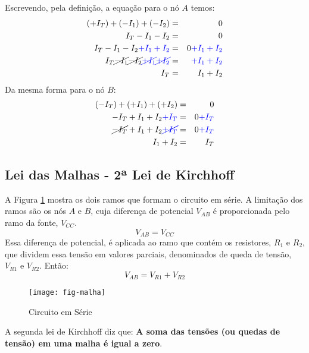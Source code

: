 Escrevendo, pela definição, a equação para o nó $A$ temos:
\begin{eqnarray}
\label{eq:1kirchhoff}
(+I_T) + (-I_1) + (-I_2) & = & 0\\
I_T - I_1 - I_2 & = & 0 \nonumber\\
I_T - I_1 - I_2 \color{blue}{+ I_1 + I_2}& = & 0 \color{blue}{+I_1 + I_2} \nonumber\\
I_T \cancel{-I_1} \cancel{- I_2} \color{blue}{\cancel{+ I_1} \cancel{+ I_2}}& = & \color{blue}{+I_1 + I_2} \nonumber\\
I_T & = & I_1 + I_2
\end{eqnarray}
Da mesma forma para o nó $B$:
\begin{eqnarray}
(-I_T) + (+I_1) + (+I_2) & = & 0 \nonumber\\
-I_T + I_1 + I_2 \color{blue}{+I_T}& = & 0\color{blue}{+I_T} \nonumber\\
\cancel{-I_T} + I_1 + I_2 \color{blue}{\cancel{+I_T}}& = & 0\color{blue}{+I_T} \nonumber\\
I_1 + I_2 & = & I_T \nonumber
\end{eqnarray}











\subsection{Lei das Malhas - 2ª Lei de Kirchhoff}

A Figura \ref{fig:malha} mostra os dois ramos que formam o circuito em série.
A limitação dos ramos são os nós $A$ e $B$, cuja diferença de potencial $V_{AB}$ é proporcionada pelo ramo da fonte, $V_{CC}$.
\begin{equation}
	V_{AB} = V_{CC}
\end{equation}
Essa diferença de potencial, é aplicada ao ramo que contém os resistores, $R_1$ e $R_2$, que dividem essa tensão em valores parciais, denominados de queda de tensão, $V_{R1}$ e $V_{R2}$. Então:
\begin{equation}
	V_{AB} = V_{R1} + V_{R2}
\end{equation}
\begin{figure}[!h]
	\centering
	\caption{Circuito em Série}
	\texttt{[image: fig-malha]}
	\label{fig:malha}
\end{figure}

A segunda lei de Kirchhoff diz que: \textbf{A soma das tensões (ou quedas de tensão) em uma malha é igual a zero}.

